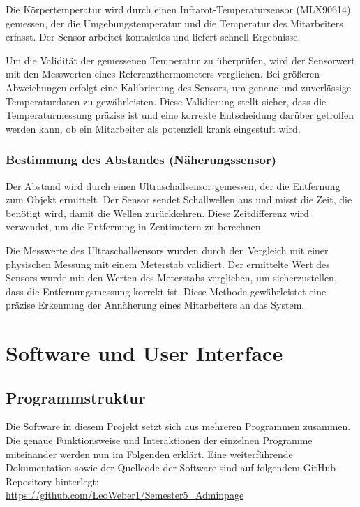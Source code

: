 Die Körpertemperatur wird durch einen Infrarot-Temperatursensor (MLX90614) gemessen, der die Umgebungstemperatur und die Temperatur des Mitarbeiters erfasst. Der Sensor arbeitet kontaktlos und liefert schnell Ergebnisse.

\vspace{1em}
\noindent Um die Validität der gemessenen Temperatur zu überprüfen, wird der Sensorwert mit den Messwerten eines Referenzthermometers verglichen. Bei größeren Abweichungen erfolgt eine Kalibrierung des Sensors, um genaue und zuverlässige Temperaturdaten zu gewährleisten. Diese Validierung stellt sicher, dass die Temperaturmessung präzise ist und eine korrekte Entscheidung darüber getroffen werden kann, ob ein Mitarbeiter als potenziell krank eingestuft wird.

\subsubsection{Bestimmung des Abstandes (Näherungssensor)}

Der Abstand wird durch einen Ultraschallsensor gemessen, der die Entfernung zum Objekt ermittelt. Der Sensor sendet Schallwellen aus und misst die Zeit, die benötigt wird, damit die Wellen zurückkehren. Diese Zeitdifferenz wird verwendet, um die Entfernung in Zentimetern zu berechnen.

\vspace{1em}
\noindent Die Messwerte des Ultraschallsensors wurden durch den Vergleich mit einer physischen Messung mit einem Meterstab validiert. Der ermittelte Wert des Sensors wurde mit den Werten des Meterstabs verglichen, um sicherzustellen, dass die Entfernungsmessung korrekt ist. Diese Methode gewährleistet eine präzise Erkennung der Annäherung eines Mitarbeiters an das System.


\section{Software und User Interface}\label{sec:software_und_user_interface}



\subsection{Programmstruktur}\label{subsec:programmstruktur}

Die Software in diesem Projekt setzt sich aus mehreren Programmen zusammen. Die genaue Funktionsweise und Interaktionen der einzelnen Programme miteinander werden nun im Folgenden erklärt. Eine weiterführende Dokumentation sowie der Quellcode der Software sind auf folgendem GitHub Repository hinterlegt:\\ \url{https://github.com/LeoWeber1/Semester5_Adminpage}


